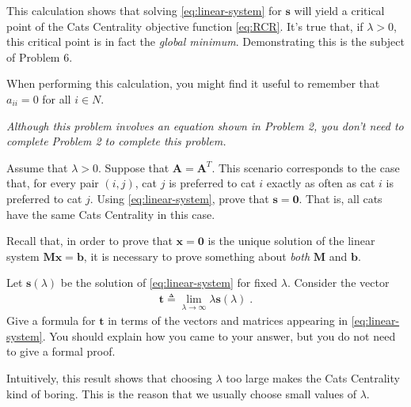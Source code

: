 \documentclass{hw}
\begin{document}
\begin{note}
    This calculation shows that solving \eqref{eq:linear-system} for $\mathbf{s}$ will yield a critical point of the Cats Centrality objective function \eqref{eq:RCR}. 
    It's true that, if $\lambda > 0$, this critical point is in fact the \emph{global minimum}. 
    Demonstrating this is the subject of Problem 6. 
\end{note}

\begin{hint}
    When performing this calculation, you might find it useful to remember that $a_{ii} = 0$ for all $i \in N$. 
\end{hint}


\emph{Although this problem involves an equation shown in Problem 2, you don't need to complete Problem 2 to complete this problem.}

Assume that $\lambda > 0$. 
Suppose that $\mathbf{A} = \mathbf{A}^T$. 
This scenario corresponds to the case that, for every pair $(i,j)$, cat $j$ is preferred to cat $i$ exactly as often as cat $i$ is preferred to cat $j$. 
Using \eqref{eq:linear-system}, prove that $\mathbf{s} = \mathbf{0}$. 
That is, all cats have the same Cats Centrality in this case. 

\begin{hint}
    Recall that, in order to prove that $\mathbf{x} = \mathbf{0}$ is the unique solution of the linear system $\mathbf{M}\mathbf{x} = \mathbf{b}$, it is necessary to prove something about \emph{both} $\mathbf{M}$ and $\mathbf{b}$. 
\end{hint}



Let $\mathbf{s}(\lambda)$ be the solution of \eqref{eq:linear-system} for fixed $\lambda$. 
Consider the vector
\begin{align}
    \mathbf{t} \triangleq \lim_{\lambda \rightarrow \infty} \lambda\mathbf{s}(\lambda)\;. 
\end{align}
Give a formula for $\mathbf{t}$ in terms of the vectors and matrices appearing in \eqref{eq:linear-system}.
You should explain how you came to your answer, but you do not need to give a formal proof.  

\begin{note}
    Intuitively, this result shows that choosing $\lambda$ too large makes the Cats Centrality kind of boring. 
    This is the reason that we usually choose small values of $\lambda$. 
\end{note}
\end{document}
